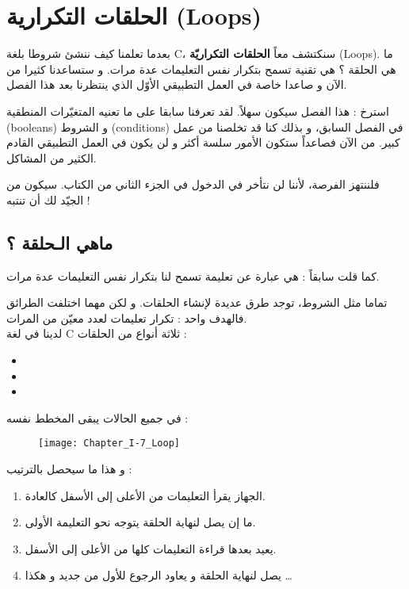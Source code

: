 \chapter{الحلقات التكرارية (\textenglish{Loops})}

بعدما تعلمنا كيف ننشئ شروطا بلغة 
\textenglish{C}،
سنكتشف معاً 
\textbf{الحلقات التكراريّة} (\textenglish{Loops}).
ما هي الحلقة ؟ هي تقنية تسمح بتكرار نفس التعليمات عدة مرات. و ستساعدنا كثيرا من الآن و صاعدا خاصة في العمل التطبيقي الأوّل الذي ينتظرنا بعد هذا الفصل.

استرخ : هذا الفصل سيكون سهلاً. لقد تعرفنا سابقا على ما تعنيه المتغيّرات المنطقية
(\textenglish{booleans})
و الشروط 
(\textenglish{conditions})
في الفصل السابق، و بذلك كنا قد تخلصنا من عمل كبير. من الآن فصاعداً ستكون الأمور سلسة أكثر و لن يكون في العمل التطبيقي القادم الكثير من المشاكل.

فلننتهز الفرصة، لأننا لن نتأخر في الدخول في الجزء الثاني من الكتاب. سيكون من الجيّد لك أن تنتبه !

\section{ماهي الـحلقة ؟}

كما قلت سابقاً : هي عبارة عن تعليمة تسمح لنا بتكرار نفس التعليمات عدة مرات. 

تماما مثل الشروط، توجد طرق عديدة لإنشاء الحلقات. و لكن مهما اختلفت الطرائق فالهدف واحد : تكرار تعليمات لعدد معيّن من المرات. \\
لدينا في لغة 
\textenglish{C}
ثلاثة أنواع من الحلقات :
\begin{itemize}
	\item {}
	\item {}
	\item {}
\end{itemize}
في جميع الحالات يبقى المخطط نفسه :

\begin{figure}[H]
	\centering
	\texttt{[image: Chapter\_I-7\_Loop]}
\end{figure}
و هذا ما سيحصل بالترتيب :

\begin{enumerate}
	\item الجهاز يقرأ التعليمات من الأعلى إلى الأسفل كالعادة.
	\item ما إن يصل لنهاية الحلقة يتوجه نحو التعليمة الأولى.
	\item يعيد بعدها قراءة التعليمات كلها من الأعلى إلى الأسفل.
	\item يصل لنهاية الحلقة و يعاود الرجوع للأول من جديد و هكذا \dots
\end{enumerate}

